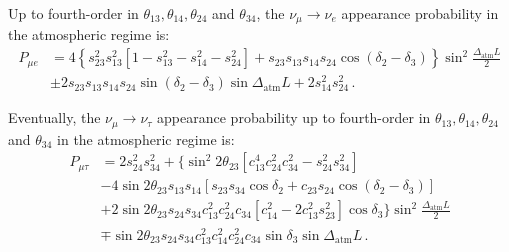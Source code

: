 \documentclass[12pt]{elsart}
\newcommand{\Atm}{\text{atm}}
\begin{document}
Up to fourth-order in $\theta_{13}, \theta_{14}, \theta_{24}$ and
$\theta_{34}$, the $\nu_\mu \to \nu_e$ appearance probability in the
atmospheric regime is: 
%
\begin{equation} \begin{split}
    \label{eq:pmue}
    P_{\mu e} &= 4 \left\lbrace s^2_{23} s^2_{13}
    [1 - s^2_{13} - s^2_{14} - s^2_{24}] 
    + s_{23} s_{13} s_{14} s_{24} \cos(\delta_2 - \delta_3) \right\rbrace
    \sin^2 \frac{\Delta_\Atm L}{2}
    \\
    & \pm 2 s_{23} s_{13} s_{14} s_{24} \sin(\delta_2 - \delta_3)
    \sin\Delta_\Atm L + 2 s^2_{14} s^2_{24} \,.
\end{split} \end{equation}

Eventually, the $\nu_\mu \to \nu_\tau$ appearance probability up to
fourth-order in $\theta_{13},\theta_{14},\theta_{24}$ and
$\theta_{34}$ in the atmospheric regime is: 
%
\begin{equation} \begin{split}
    \label{eq:pmutau}
    P_{\mu \tau} &= 2 s^2_{24} s^2_{34} + \big\lbrace \sin^2 2 \theta_{23}
    [c^4_{13} c^2_{24} c^2_{34} - s^2_{24} s^2_{34}]
    \\
    &- 4 \sin 2 \theta_{23} s_{13} s_{14} [s_{23} s_{34} \cos\delta_2
    + c_{23} s_{24} \cos(\delta_2 - \delta_3)]
    \\
    &+ 2 \sin 2 \theta_{23} s_{24} s_{34} c^2_{13} c^2_{24} c_{34}
    [c^2_{14} - 2 c^2_{13} s^2_{23}] \cos\delta_3 \big\rbrace
    \sin^2 \frac{\Delta_\Atm L}{2}
    \\
    &\mp \sin 2 \theta_{23} s_{24} s_{34} c^2_{13} c^2_{14} c^2_{24} c_{34}
    \sin\delta_3 \sin\Delta_\Atm L \,.
\end{split} \end{equation}
\end{document}
